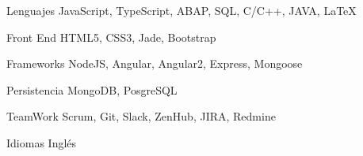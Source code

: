 


\begin{cvskills}


\cvskill
{Lenguajes} %
{JavaScript, TypeScript, ABAP, SQL, C/C++, JAVA, \LaTeX{} } %

\cvskill
{Front End} %
{HTML5, CSS3, Jade, Bootstrap} %

\cvskill
{Frameworks} %
{NodeJS, Angular, Angular2, Express, Mongoose} %


\cvskill
{Persistencia} %
{MongoDB, PosgreSQL} %

\cvskill
{TeamWork} %
{Scrum, Git, Slack, ZenHub, JIRA, Redmine} %

\cvskill
{Idiomas} %
{Inglés} %


\end{cvskills}
